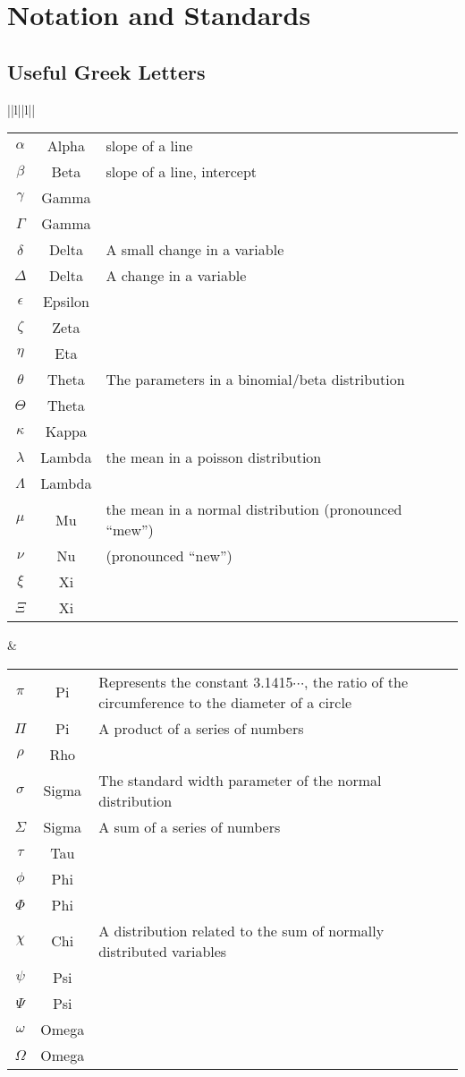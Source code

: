 \chapter{Notation and Standards}\label{app:notation}


\section{Useful Greek Letters}\label{sec:greek}
\begin{fullwidth}
\begin{tabular}{||l||l||} \hline\hline
\begin{tabular}{ccp{2in}}
$\alpha$& Alpha & slope of a line\\
$\beta$ & Beta & slope of a line, intercept\\
$\gamma$ &  Gamma & \\
$\Gamma$ & Gamma & \\
$\delta$ &  Delta & A small change in a variable\\
$\Delta$ & Delta & A change in a variable\\
$\epsilon$ &  Epsilon &\\
$\zeta$ &  Zeta & \\
$\eta$ &  Eta & \\
$\theta$ &  Theta & The parameters in a  binomial/beta distribution\\
$\Theta$ & Theta & \\
$\kappa$ & Kappa & \\
$\lambda$ &  Lambda & the mean in a poisson distribution \\
$\Lambda$ & Lambda & \\
$\mu$ &  Mu & the mean in a normal distribution (pronounced ``mew'')\\
$\nu$ &  Nu & (pronounced ``new'')\\
$\xi$ &  Xi & \\
$\Xi$ & Xi & 
\end{tabular}
&
\begin{tabular}{ccp{2in}}
$\pi$ & Pi & Represents the constant 3.1415$\cdots$, the ratio of the circumference to the diameter of a circle\\
$\Pi$ & Pi & A product of a series of numbers\\
$\rho$ &  Rho & \\
$\sigma$ &  Sigma & The standard width parameter of the normal distribution\\
$\Sigma$ & Sigma & A sum of a series of numbers \\
$\tau$ &  Tau & \\
$\phi$ &  Phi & \\
$\Phi$ & Phi & \\
$\chi$ &  Chi & A distribution related to the sum of normally distributed variables\\
$\psi$ &  Psi & \\
$\Psi$ & Psi & \\
$\omega$ &  Omega & \\
$\Omega$ & Omega & 
\end{tabular}\\ \hline\hline
\end{tabular}
\end{fullwidth}


